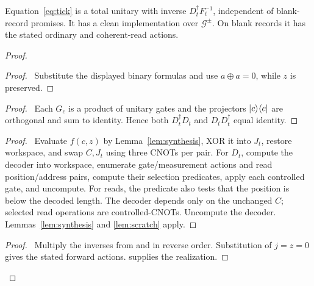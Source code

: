 \begin{lemma}\label{lem:joint}
Equation~\eqref{eq:tick} is a total unitary with inverse
$D_t^\dagger F_t^{-1}$, independent of blank-record promises. It has a
clean implementation over $\mathcal G^{\pm}$. On blank records it has
the stated ordinary and coherent-read actions.
\end{lemma}
\begin{proof}
 \begin{proof}\pf\ Substitute the displayed binary formulas and use
 $a\oplus a=0$, while $z$ is preserved.\end{proof}
 \begin{proof}\pf\ Each $G_c$ is a product of unitary gates and the
 projectors $\lvert c\rangle\langle c\rvert$ are orthogonal and sum to identity. Hence both
 $D_t^\dagger D_t$ and $D_tD_t^\dagger$ equal identity.\end{proof}
 \begin{proof}\pf\ Evaluate $f(c,z)$ by Lemma~\ref{lem:synthesis}, XOR
 it into $J_t$, restore workspace, and swap $C,J_t$ using three CNOTs
 per pair. For $D_t$, compute the decoder into workspace, enumerate
 gate/measurement actions and read position/address pairs, compute
 their selection predicates, apply each controlled gate, and uncompute.
 For reads, the predicate also tests that the position is below the
 decoded length. The decoder depends only on the unchanged $C$;
 selected read operations are controlled-CNOTs. Uncompute the decoder.
 Lemmas~\ref{lem:synthesis} and \ref{lem:scratch} apply.\end{proof}
 \qedstep
 \begin{proof}\pf\ Multiply the inverses from
  and  in reverse
 order. Substitution of $j=z=0$ gives the stated forward actions.
  supplies the realization.\end{proof}
\end{proof}

